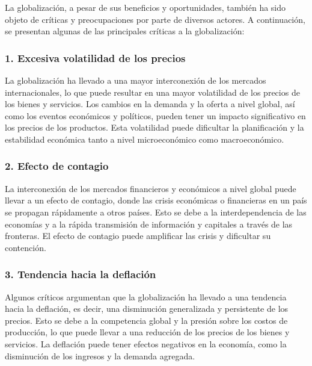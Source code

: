 \documentclass[
  a4paper,
]{article}
\begin{document}
La globalización, a pesar de sus beneficios y oportunidades, también ha
sido objeto de críticas y preocupaciones por parte de diversos actores.
A continuación, se presentan algunas de las principales críticas a la
globalización:

\hypertarget{excesiva-volatilidad-de-los-precios}{%
\subsubsection{1. Excesiva volatilidad de los
precios}\label{excesiva-volatilidad-de-los-precios}}

La globalización ha llevado a una mayor interconexión de los mercados
internacionales, lo que puede resultar en una mayor volatilidad de los
precios de los bienes y servicios. Los cambios en la demanda y la oferta
a nivel global, así como los eventos económicos y políticos, pueden
tener un impacto significativo en los precios de los productos. Esta
volatilidad puede dificultar la planificación y la estabilidad económica
tanto a nivel microeconómico como macroeconómico.

\hypertarget{efecto-de-contagio}{%
\subsubsection{2. Efecto de contagio}\label{efecto-de-contagio}}

La interconexión de los mercados financieros y económicos a nivel global
puede llevar a un efecto de contagio, donde las crisis económicas o
financieras en un país se propagan rápidamente a otros países. Esto se
debe a la interdependencia de las economías y a la rápida transmisión de
información y capitales a través de las fronteras. El efecto de contagio
puede amplificar las crisis y dificultar su contención.

\hypertarget{tendencia-hacia-la-deflaciuxf3n}{%
\subsubsection{3. Tendencia hacia la
deflación}\label{tendencia-hacia-la-deflaciuxf3n}}

Algunos críticos argumentan que la globalización ha llevado a una
tendencia hacia la deflación, es decir, una disminución generalizada y
persistente de los precios. Esto se debe a la competencia global y la
presión sobre los costos de producción, lo que puede llevar a una
reducción de los precios de los bienes y servicios. La deflación puede
tener efectos negativos en la economía, como la disminución de los
ingresos y la demanda agregada.
\end{document}
